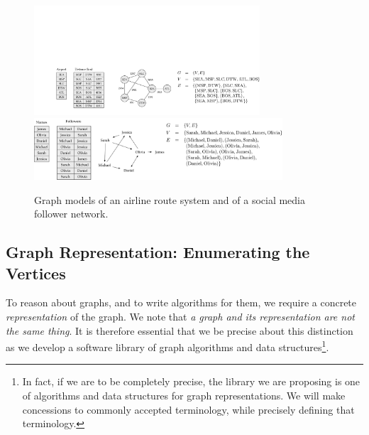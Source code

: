 \begin{figure}[ht]
  \begin{center}
    {\includegraphics[width=0.75\textwidth]{figs/airport-summary.pdf}}
    \\
    {\includegraphics[width=0.825\textwidth]{figs/instagram-summary.pdf}}
    \caption{Graph models of an airline route system and of a social media follower network.\label{fig:node_link_graphs}}
  \end{center}
\end{figure}


\subsection{Graph Representation: Enumerating the Vertices}

To reason about graphs, and to write algorithms for them, we require a concrete \emph{representation} of the graph.
We note that \emph{a graph and its representation are not the same thing}.  It is therefore essential
that we be precise about this distinction as we develop a software library of graph
algorithms and data structures\footnote{In fact, if we are to be completely precise, the library we are
proposing is one of algorithms and data structures for graph representations.  We will make concessions
to commonly accepted terminology, while precisely defining that terminology.}.

